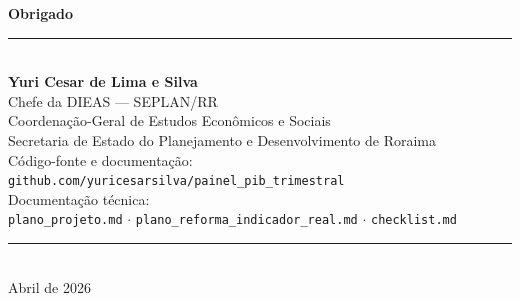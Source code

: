 \documentclass[aspectratio=169, 11pt]{beamer}
\begin{document}
{
\begin{frame}[plain]
  \begin{center}
    \vspace{0.5cm}
    {\Large\color{seplanblue}\textbf{Obrigado}}\\[0.5cm]
    {\color{seplanblue}\rule{8cm}{0.5pt}}\\[0.5cm]
    {\normalsize
      \textbf{Yuri Cesar de Lima e Silva}\\
      Chefe da DIEAS — SEPLAN/RR\\[0.3cm]
      Coordenação-Geral de Estudos Econômicos e Sociais\\
      Secretaria de Estado do Planejamento e Desenvolvimento de Roraima\\[0.5cm]
    }
    {\small\color{gray}
      Código-fonte e documentação:\\
      \texttt{github.com/yuricesarsilva/painel\_pib\_trimestral}\\[0.3cm]
      Documentação técnica:\\
      \texttt{plano\_projeto.md} $\cdot$
      \texttt{plano\_reforma\_indicador\_real.md} $\cdot$
      \texttt{checklist.md}
    }\\[0.5cm]
    {\color{seplanblue}\rule{8cm}{0.5pt}}\\[0.3cm]
    {\footnotesize\color{gray} Abril de 2026}
  \end{center}
\end{frame}
}

\appendix
\end{document}

